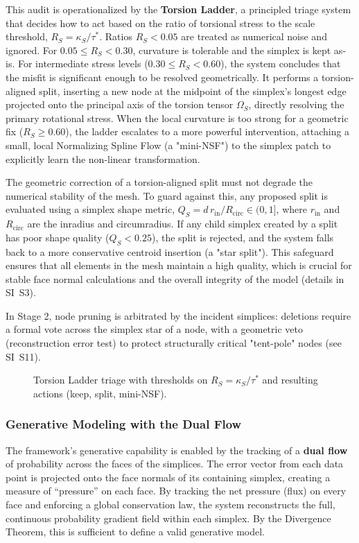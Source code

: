 \documentclass[11pt]{article}
\begin{document}
This audit is operationalized by the \textbf{Torsion Ladder}, a principled triage system that decides how to act based on the ratio of torsional stress to the scale threshold, $R_S = \kappa_S / \tau^*$. Ratios $R_S < 0.05$ are treated as numerical noise and ignored. For $0.05 \le R_S < 0.30$, curvature is tolerable and the simplex is kept as-is. For intermediate stress levels ($0.30 \le R_S < 0.60$), the system concludes that the misfit is significant enough to be resolved geometrically. It performs a torsion-aligned split, inserting a new node at the midpoint of the simplex's longest edge projected onto the principal axis of the torsion tensor $\Omega_S$, directly resolving the primary rotational stress. When the local curvature is too strong for a geometric fix ($R_S \ge 0.60$), the ladder escalates to a more powerful intervention, attaching a small, local Normalizing Spline Flow (a "mini-NSF") to the simplex patch to explicitly learn the non-linear transformation.

The geometric correction of a torsion-aligned split must not degrade the numerical stability of the mesh. To guard against this, any proposed split is evaluated using a simplex shape metric, $Q_S = d\,r_{\mathrm{in}}/R_{\mathrm{circ}} \in (0,1]$, where $r_{\mathrm{in}}$ and $R_{\mathrm{circ}}$ are the inradius and circumradius. If any child simplex created by a split has poor shape quality ($Q_S < 0.25$), the split is rejected, and the system falls back to a more conservative centroid insertion (a "star split"). This safeguard ensures that all elements in the mesh maintain a high quality, which is crucial for stable face normal calculations and the overall integrity of the model (details in SI~S3).

In Stage 2, node pruning is arbitrated by the incident simplices: deletions require a formal vote across the simplex star of a node, with a geometric veto (reconstruction error test) to protect structurally critical "tent-pole" nodes (see SI~S11).

\begin{figure}[t]
    \centering
    \caption{Torsion Ladder triage with thresholds on $R_S = \kappa_S/\tau^*$ and resulting actions (keep, split, mini-NSF).}
    \label{fig:ladder}
\end{figure}

\subsubsection{Generative Modeling with the Dual Flow}
The framework's generative capability is enabled by the tracking of a \textbf{dual flow} of probability across the faces of the simplices. The error vector from each data point is projected onto the face normals of its containing simplex, creating a measure of ``pressure'' on each face. By tracking the net pressure (flux) on every face and enforcing a global conservation law, the system reconstructs the full, continuous probability gradient field within each simplex. By the Divergence Theorem, this is sufficient to define a valid generative model.
\end{document}
